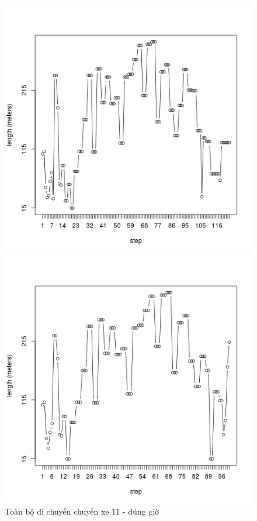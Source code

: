\documentclass[a4paper, 13pt]{report}
\begin{document}
\FloatBarrier
\FloatBarrier
\begin{figure}[!htb]
  \includegraphics[width=\linewidth]{test_100_11}
  \caption*{Toàn bộ di chuyển chuyến xe 11 - đúng giờ}
\endminipage
{}
  \includegraphics[width=\linewidth]{test_80_11}

\end{figure}
\end{document}
